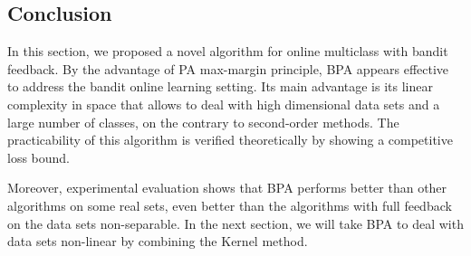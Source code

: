 \subsection{Conclusion}
\label{subsec:BPAC}
In this section, we proposed a novel algorithm for online multiclass with bandit feedback. By the advantage of PA max-margin principle, BPA appears effective to address the bandit online learning setting. Its main advantage is its linear complexity in space that allows to deal with high dimensional data sets and a large number of classes, on the contrary to second-order methods. The practicability of this algorithm is verified theoretically by showing a competitive loss bound.

Moreover, experimental evaluation shows that BPA performs better than other algorithms on some real sets, even better than the algorithms with full feedback on the data sets non-separable.
In the next section, we will take BPA to deal with data sets non-linear by combining the Kernel method. 
